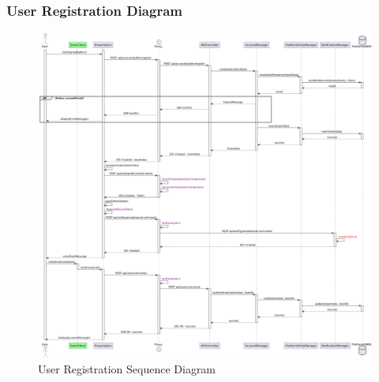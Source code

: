 \subsubsection*{User Registration Diagram}

\begin{figure}[H]
    \centering
    \includegraphics[width=\linewidth]{Latex/Images/DD/SequenceDiagrams/1.0UserRegistration.png}
    \caption{User Registration Sequence Diagram}
    \label{fig:userregistration}
\end{figure}

